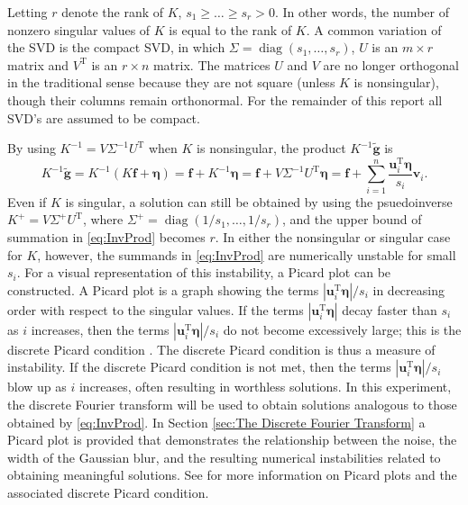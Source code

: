 \documentclass[12pt]{article}
\newcommand{\gnoise}{\widetilde{\mathbf{g}}}
\newcommand{\kmat}{K}	%
\newcommand{\fdis}{\mathbf{f}}
\newcommand{\trans}{\mathrm{T}}	%
\newcommand{\diag}{\operatorname{diag}}
\newcommand{\noise}{\bm{\eta}}	%
\newcommand{\singular}{s}	%
\newcommand{\LSV}{\mathbf{u}}	%
\newcommand{\RSV}{\mathbf{v}}	%
\begin{document}
Letting $r$ denote the rank of $\kmat$,  $\singular_1 \geq \ldots \geq \singular_r > 0$. In other words, the number of nonzero singular values of $\kmat$ is equal to the rank of $\kmat$.  A common variation of the SVD is the compact SVD, in which $\Sigma = \diag(\singular_1,\ldots,\singular_r)$, $U$ is an $m \times r$ matrix and $V^\trans$ is an $r \times n$ matrix. The matrices $U$ and $V$ are no longer orthogonal in the traditional sense because they are not square (unless $\kmat$ is nonsingular), though their columns remain orthonormal. For the remainder of this report all SVD's are assumed to be compact.  \par 
By using $\kmat^{-1} = V\Sigma^{-1}U^\trans$ when $\kmat$ is nonsingular, the product $\kmat^{-1}\gnoise$ is
\begin{equation}
\kmat^{-1}\gnoise = \kmat^{-1}\left(\kmat\fdis + \noise\right) = \fdis + \kmat^{-1}\noise = \fdis + V\Sigma^{-1}{U^\trans}\noise = \fdis + \sum_{i = 1}^n \frac{{\LSV^\trans_i}\noise}{\singular_i}\RSV_i. 
\label{eq:InvProd}
\end{equation}
Even if $\kmat$ is singular, a solution can still be obtained by using the psuedoinverse $\kmat^+ = V{\Sigma^+}U^\trans$, where $\Sigma^+ = \diag(1/\singular_1,\ldots,1/\singular_r)$, and the upper bound of summation in \eqref{eq:InvProd} becomes $r$. In either the nonsingular or singular case for $\kmat$, however, the summands in \eqref{eq:InvProd} are numerically unstable for small $\singular_i$. For a visual representation of this instability, a Picard plot can be constructed. A Picard plot is a graph showing the terms $|\LSV^\trans_i\noise|/\singular_i$ in decreasing order with respect to the singular values. If the terms $|\LSV^\trans_i\noise|$ decay faster than $\singular_i$ as $i$ increases, then the terms $|\LSV^\trans_i\noise|/\singular_i$ do not become excessively large; this is the discrete Picard condition \cite{ABT}. The discrete Picard condition is thus a measure of instability. If the discrete Picard condition is not met, then the terms $|\LSV^\trans_i\noise|/\singular_i$ blow up as $i$ increases, often resulting in worthless solutions. In this experiment, the discrete Fourier transform will be used to obtain solutions analogous to those obtained by \eqref{eq:InvProd}. In Section \ref{sec:The Discrete Fourier Transform} a Picard plot is provided that demonstrates the relationship between the noise, the width of the Gaussian blur, and the resulting numerical instabilities related to obtaining meaningful solutions. See \cite{Hansen1990} for more information on Picard plots and the associated discrete Picard condition. \par 
\end{document}
